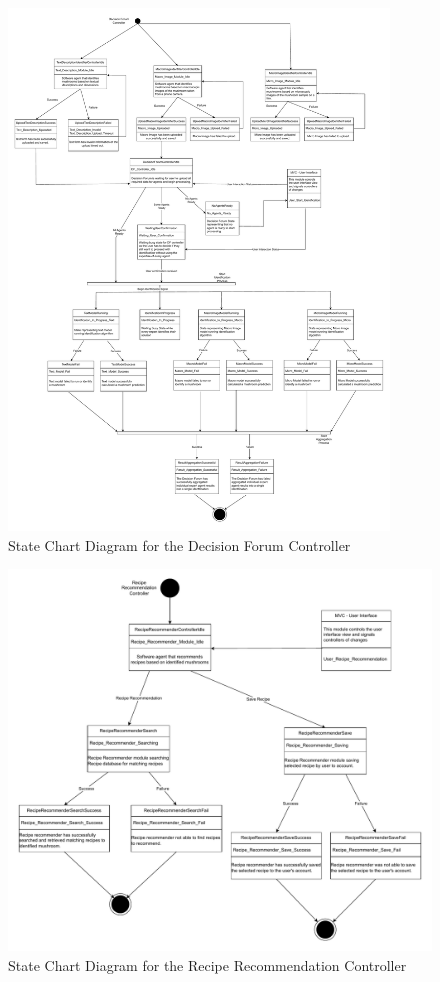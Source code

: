 \documentclass[]{article}
\begin{document}
\begin{figure}[H]
    \centering
    \includegraphics[width=0.9\textwidth]{SE3A04_D3_Diagram_Omar-Page-1.drawio.pdf}
    \caption{State Chart Diagram for the Decision Forum Controller}
\end{figure}

\begin{figure}[H]
    \centering
    \includegraphics[width=\textwidth]{SE3A04_D3_Diagram_Omar-Page-2.drawio.pdf}
    \caption{State Chart Diagram for the Recipe Recommendation Controller}
\end{figure}
\end{document}
